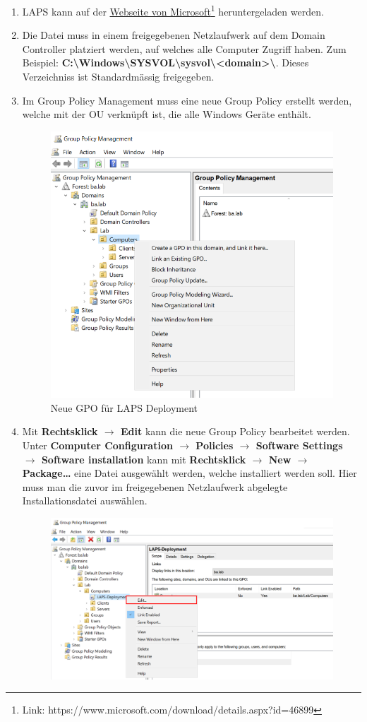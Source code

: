 \begin{enumerate}
    \item LAPS kann auf der \href{https://www.microsoft.com/download/details.aspx?id=46899}{Webseite von Microsoft}\footnote{Link: https://www.microsoft.com/download/details.aspx?id=46899} heruntergeladen werden.
    \item Die Datei muss in einem freigegebenen Netzlaufwerk auf dem Domain Controller platziert werden, auf welches alle Computer Zugriff haben.
    Zum Beispiel: \textbf{C:\textbackslash Windows\textbackslash SYSVOL\textbackslash sysvol\textbackslash <domain>\textbackslash}. 
    Dieses Verzeichniss ist Standardmässig freigegeben.
    \item Im Group Policy Management muss eine neue Group Policy erstellt werden, welche mit der OU verknüpft ist, die alle Windows Geräte enthält.
    \begin{figure}[H]
        \centering
        \includegraphics[width=0.7\linewidth]{../img/LAPS/GPO-Create-New.png}
        \caption{Neue GPO für LAPS Deployment}
    \end{figure}
    \item Mit \textbf{Rechtsklick $\rightarrow$ Edit} kann die neue Group Policy bearbeitet werden.
    Unter \textbf{Computer Configuration $\rightarrow$ Policies $\rightarrow$ Software Settings $\rightarrow$ Software installation} kann mit \textbf{Rechtsklick $\rightarrow$ New $\rightarrow$ Package\dots} eine Datei ausgewählt werden, welche installiert werden soll.
    Hier muss man die zuvor im freigegebenen Netzlaufwerk abgelegte Installationsdatei auswählen.
    \begin{figure}[H]
        \centering
        \includegraphics[width=0.7\linewidth]{../img/LAPS/GPO-Edit-Deployment.png}

\end{figure}
\end{enumerate}
